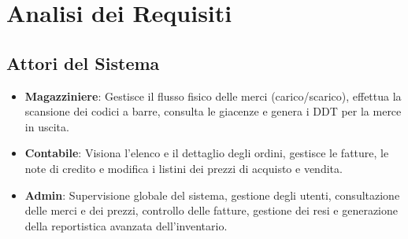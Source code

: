 \documentclass[a4paper,12pt]{article}
\begin{document}
\section{Analisi dei Requisiti}

\subsection{Attori del Sistema}
\begin{itemize}
    \item \textbf{Magazziniere}: Gestisce il flusso fisico delle merci (carico/scarico), effettua la scansione dei codici a barre, consulta le giacenze e genera i DDT per la merce in uscita.
    \item \textbf{Contabile}: Visiona l'elenco e il dettaglio degli ordini, gestisce le fatture, le note di credito e modifica i listini dei prezzi di acquisto e vendita.
    \item \textbf{Admin}: Supervisione globale del sistema, gestione degli utenti, consultazione delle merci e dei prezzi, controllo delle fatture, gestione dei resi e generazione della reportistica avanzata dell'inventario.
\end{itemize}
\end{document}
